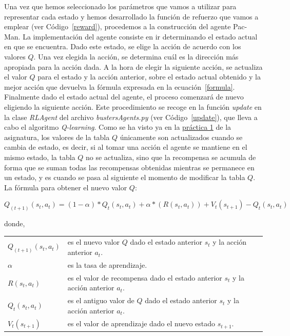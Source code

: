 \documentclass[11pt]{exam}
\makeatletter
\newenvironment{conditions}
{\par\vspace{\abovedisplayskip}\noindent\begin{tabular}{>{$}l<{$} @{${}\:{}$} l}}
	{\end{tabular}\par\vspace{\belowdisplayskip}}
\makeatother
\begin{document}
Una vez que hemos seleccionado los parámetros que vamos a utilizar para representar cada estado y hemos desarrollado la función de refuerzo que vamos a emplear (ver Código~\ref{reward}), procedemos a la construcción del agente Pac-Man. La implementación del agente consiste en ir determinando el estado actual en que se encuentra. Dado este estado, se elige la acción de acuerdo con los valores $Q$. Una vez elegida la acción, se determina cuál es la dirección más apropiada para la acción dada. A la hora de elegir la siguiente acción, se actualiza el valor $Q$ para el estado y la acción anterior, sobre el estado actual obtenido y la mejor acción que devuelva la fórmula expresada en la ecuación~\ref{formula}. Finalmente dado el estado actual del agente, el proceso comenzará de nuevo eligiendo la siguiente acción. Este procedimiento se recoge en la función \textit{update} en la clase \textit{RLAgent} del archivo \textit{bustersAgents.py} (ver Código~\ref{update}), que lleva a cabo el algoritmo \textit{Q-learning}. Como se ha visto ya en la \href{https://poliformat.upv.es/portal/site/ESP_0_2835/tool/c07b745a-0cfd-44f0-a7a2-9bb22f80c3f7?panel=Main}{práctica 1} de la asignatura, los valores de la tabla $Q$ únicamente son actualizados cuando se cambia de estado, es decir, si al tomar una acción el agente se mantiene en el mismo estado, la tabla $Q$ no se actualiza, sino que la recompensa se acumula de forma que se suman todas las recompensas obtenidas mientras se permanece en un estado, y es cuando se pasa al siguiente el momento de modificar la tabla $Q$. La fórmula para obtener el nuevo valor $Q$:

\begin{equation}\label{formula}
	Q_{(t+1)}(s_{t},a_{t}) = (1-\alpha) * Q_{t}(s_{t},a_{t}) + \alpha * (R(s_{t},a_{t})) + V_{t}(s_{t+1}) - Q_{t}(s_{t},a_{t})
\end{equation}

donde,

\begin{conditions}
	Q_{(t+1)}(s_{t},a_{t}) & es el nuevo valor $Q$ dado el estado anterior $s_{t}$ y la acción anterior $a_{t}$. \\
	\alpha & es la tasa de aprendizaje. \\
	R(s_{t},a_{t}) & es el valor de recompensa dado el estado anterior $s_{t}$ y la acción anterior $a_{t}$.	\\
	Q_{t}(s_{t},a_{t}) & es el antiguo valor de $Q$ dado el estado anterior $s_{t}$ y la acción anterior $a_{t}$.	\\
	V_{t}(s_{t+1}) & es el valor de aprendizaje dado el nuevo estado $s_{t+1}$.
\end{conditions}
\vspace*{3mm}
\end{document}

